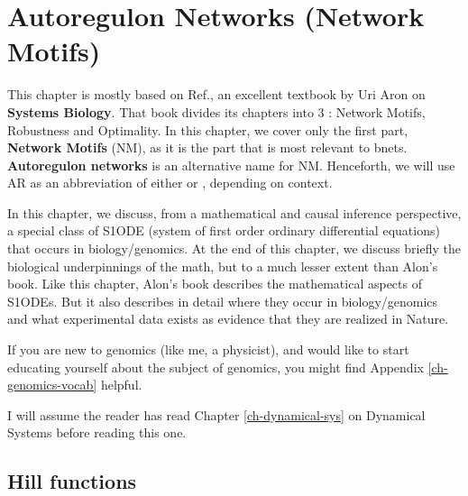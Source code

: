\chapter{Autoregulon Networks (Network Motifs)}
\label{ch-autoregulons}


This chapter is mostly based on Ref.\cite{alon-book},
an excellent textbook by Uri Aron 
on {\bf Systems Biology}. That book divides its chapters into 3 : Network Motifs, Robustness and Optimality. In this chapter, we cover only the first part, {\bf Network Motifs} (NM), as it is the part that is most relevant to bnets. {\bf Autoregulon networks}
is an alternative name for NM. 
Henceforth, we will use AR as 
an abbreviation of either
or ,
depending on context.

In this chapter, we discuss,
from a mathematical and causal inference perspective, a  special 
class of 
S1ODE (system of first order ordinary differential equations) that occurs in biology/genomics.
At the end of this chapter,
we discuss briefly the biological
underpinnings of the math, but 
to a much lesser extent than Alon's book.
 Like this chapter, 
Alon's book describes the mathematical aspects of
 S1ODEs. But it 
also describes  in detail where they occur in biology/genomics and what experimental data exists as evidence that they are 
realized in Nature. 

If you are new to genomics (like me, a physicist), and would like to start educating yourself about the subject
of genomics, you might find Appendix \ref{ch-genomics-vocab} helpful.


I will assume
the reader has read 
 Chapter \ref{ch-dynamical-sys}
on Dynamical Systems before reading this one.



\section{Hill functions}

